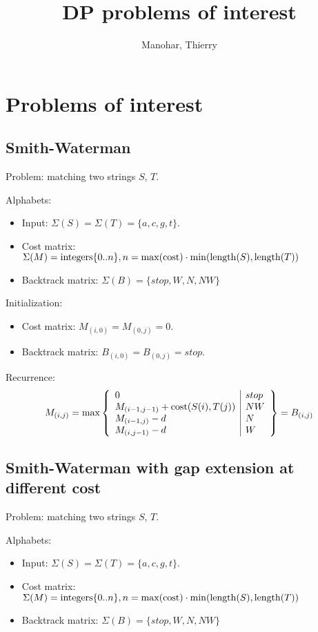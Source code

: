 \documentclass[11pt]{article}
\title{DP problems of interest}
\author{Manohar, Thierry}
\date{}
\def\ul{\begin{itemize}}
\def\ule{\end{itemize}}
\begin{document}
\maketitle
\pagestyle{headings}

\section{Problems of interest}
\subsection{Smith-Waterman}
Problem: matching two strings $S$, $T$.

Alphabets:\ul
\item Input: $\Sigma(S)=\Sigma(T)=\{a,c,g,t\}$.
\item Cost matrix: $\Sigma(M) = {\rm integers} \{0..n\}, n=\max({\rm cost}) \cdot \min({\rm length}(S),{\rm length}(T))$
\item Backtrack matrix: $\Sigma(B)=\{stop,W,N,NW\}$
\ule

Initialization:\ul
\item Cost matrix: $M_{(i,0)}=M_{(0,j)}=0$.
\item Backtrack matrix: $B_{(i,0)}=B_{(0,j)}=stop$.
\ule

Recurrence:
\[M_{(i,j)}=\max\left\{\begin{array}{l|l}
	0 & stop\\
	M_{(i-1,j-1)}+{\rm cost}(S(i),T(j)) & NW\\
	M_{(i-1,j)}-d & N\\
	M_{(i,j-1)}-d & W
\end{array}\right\}=B_{(i,j)} \]

\subsection{Smith-Waterman with gap extension at different cost}
Problem: matching two strings $S$, $T$.

Alphabets:\ul
\item Input: $\Sigma(S)=\Sigma(T)=\{a,c,g,t\}$.
\item Cost matrix: $\Sigma(M) = {\rm integers} \{0..n\}, n=\max({\rm cost}) \cdot \min({\rm length}(S),{\rm length}(T))$
\item Backtrack matrix: $\Sigma(B)=\{stop,W,N,NW\}$
\ule
\end{document}
